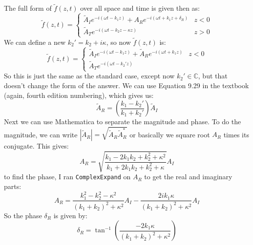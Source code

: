 \documentclass[10pt]{article}
\begin{document}
\begin{enumerate}[label=(\alph*)]
			\begin{solution}
				The full form of \( \tilde f(z, t) \) over all space and time is given then as:
				\[
					\tilde f(z, t) = \begin{cases}
						\tilde A_I e^{-i (\omega t - k_1z)} + A_R e^{-i (\omega t + k_1z + \delta_R)} & z < 0\\
						\tilde A_T e^{-i (\omega t - k_2z - \kappa z)} & z > 0
					\end{cases}
				\]
				We can define a new \( k_2' = k_2 + i\kappa \), so now \( \tilde f(z, t) \) is:
				\[
					\tilde f(z, t) = \begin{cases}
						\tilde A_I e^{-i (\omega t - k_1z)} + \tilde A_R e^{-i (\omega t + k_1z)} & z < 0\\
						\tilde A_T e^{-i (\omega t - k_2' z)}
					\end{cases}
				\]
				So this is just the same as the standard case, except now \( k_2' \in \mathbb C \), but that
				doesn't change the form of the answer. We can use Equation 9.29 in the textbook (again,
				fourth edition numbering), which gives us:
				\[
					\tilde A_R = \left( \frac{k_1 - k_2'}{k_1 + k_2'} \right) \tilde A_I
				\]
				Next we can use Mathematica to separate the magnitude and phase. To do the magnitude, we
				can write \( |\tilde A_R| = \sqrt{\tilde A_R \tilde A_R^{*}} \) or basically we square root
				\( A_R \) times its conjugate. This gives:
				\[
					A_R = \sqrt{\frac{k_1 - 2k_1k_2 + k_2^2 + \kappa^2}{k_1 + 2 k_1 k_2 + k_2^2 + \kappa}}
					A_I
				\]
				to find the phase, I ran \texttt{ComplexExpand} on \( A_R \) to get the real and imaginary
				parts:
				\[
					A_R = \frac{k_1^2 - k_2^2 - \kappa^2}{(k_1 + k_2)^2 + \kappa^2} A_I  - \frac{2 i k_1
					\kappa}{(k_1 + k_2)^2 + \kappa^2} A_I
				\]
				So the phase \( \delta_R \) is given by:
				\[
					\delta_R = \tan^{-1}\left( \frac{-2 k_1 \kappa}{(k_1 + k_2)^2 + \kappa^2} \right)
				\]
			\end{solution}
	\end{enumerate}
\end{document}
